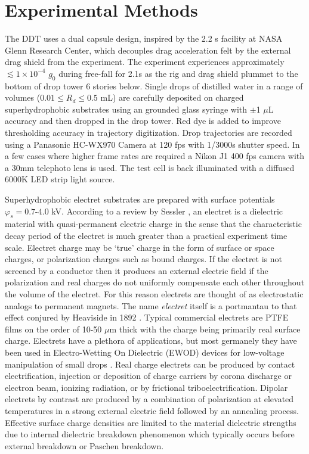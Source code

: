 \documentclass[12pt,a4paper,oneside]{book}
\begin{document}
\section{Experimental Methods}
The DDT uses a dual capsule design, inspired by the 2.2 s facility at NASA Glenn Research Center, which decouples drag acceleration felt by the external drag shield from the experiment. The experiment experiences approximately $\lesssim 1 \times 10^{-4}$ $g_0$ during free-fall for 2.1s as the rig and drag shield plummet to the bottom of drop tower 6 stories below. Single drops of distilled water in a range of volumes ($0.01 \leq R_d \leq 0.5$ mL) are carefully deposited on charged superhydrophobic substrates using an grounded glass syringe with $\pm $1 $\mu$L accuracy and then dropped in the drop tower. Red dye is added to improve thresholding accuracy in trajectory digitization. Drop trajectories are recorded using a Panasonic HC-WX970 Camera at 120 fps with 1/3000s shutter speed. In a few cases where higher frame rates are required a Nikon J1 400 fps camera with a 30mm telephoto lens is used. The test cell is back illuminated with a diffused 6000K LED strip light source.  

Superhydrophobic electret substrates are prepared with surface potentials $\varphi_s = 0.7$-$4.0$ kV. According to a review by Sessler \cite{sessler_electrets_1987}, an electret is a dielectric material with quasi-permanent electric charge in the sense that the characteristic decay period of the electret is much greater than a practical experiment time scale. Electret charge may be `true' charge in the form of surface or space charges, or polarization charges such as bound charges. If the electret is not screened by a conductor then it produces an external electric field if the polarization and real charges do not uniformly compensate each other throughout the volume of the electret. For this reason electrets are thought of as electrostatic analogs to permanent magnets. The name \emph{electret} itself is a portmantau to that effect conjured by Heaviside in 1892 \cite{heaviside_electrical_2011}. Typical commercial electrets are PTFE films on the order of 10-50 $\mu$m thick with the charge being primarily real surface charge. Electrets have a plethora of applications, but most germanely they have been used in Electro-Wetting On Dielectric (EWOD) devices for low-voltage manipulation of small drops \cite{wu_low-voltage_2010}. Real charge electrets can be produced by contact electrification, injection or deposition of charge carriers by corona discharge or electron beam, ionizing radiation, or by frictional triboelectrification. Dipolar electrets by contrast are produced by a combination of polarization at elevated temperatures in a strong external electric field followed by an annealing process. Effective surface charge densities are limited to the material dielectric strengths due to internal dielectric breakdown phenomenon which typically occurs before external breakdown or Paschen breakdown. 
\end{document}
